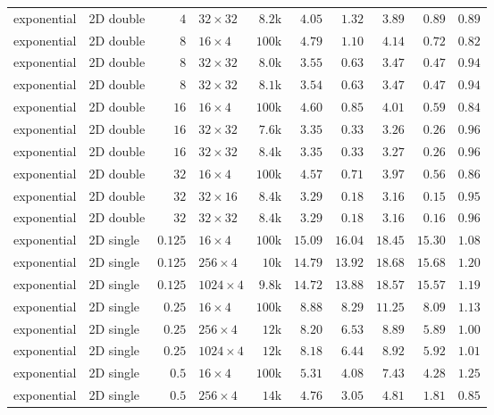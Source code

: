 {\begin{longtable}{llrlrrrrrr}
    exponential & 2D double & $4$ & $32{\times}32$ & $8.2$k & $4.05$ & $1.32$ & $3.89$ & $0.89$ & $0.89$ \\
    exponential & 2D double & $8$ & $16{\times}4$ & $100$k & $4.79$ & $1.10$ & $4.14$ & $0.72$ & $0.82$ \\
    exponential & 2D double & $8$ & $32{\times}32$ & $8.0$k & $3.55$ & $0.63$ & $3.47$ & $0.47$ & $0.94$ \\
    exponential & 2D double & $8$ & $32{\times}32$ & $8.1$k & $3.54$ & $0.63$ & $3.47$ & $0.47$ & $0.94$ \\
    exponential & 2D double & $16$ & $16{\times}4$ & $100$k & $4.60$ & $0.85$ & $4.01$ & $0.59$ & $0.84$ \\
    exponential & 2D double & $16$ & $32{\times}32$ & $7.6$k & $3.35$ & $0.33$ & $3.26$ & $0.26$ & $0.96$ \\
    exponential & 2D double & $16$ & $32{\times}32$ & $8.4$k & $3.35$ & $0.33$ & $3.27$ & $0.26$ & $0.96$ \\
    exponential & 2D double & $32$ & $16{\times}4$ & $100$k & $4.57$ & $0.71$ & $3.97$ & $0.56$ & $0.86$ \\
    exponential & 2D double & $32$ & $32{\times}16$ & $8.4$k & $3.29$ & $0.18$ & $3.16$ & $0.15$ & $0.95$ \\
    exponential & 2D double & $32$ & $32{\times}32$ & $8.4$k & $3.29$ & $0.18$ & $3.16$ & $0.16$ & $0.96$ \\
    \midrule
    exponential & 2D single & $0.125$ & $16{\times}4$ & $100$k & $15.09$ & $16.04$ & $18.45$ & $15.30$ & $1.08$ \\
    exponential & 2D single & $0.125$ & $256{\times}4$ & $10$k & $14.79$ & $13.92$ & $18.68$ & $15.68$ & $1.20$ \\
    exponential & 2D single & $0.125$ & $1024{\times}4$ & $9.8$k & $14.72$ & $13.88$ & $18.57$ & $15.57$ & $1.19$ \\
    exponential & 2D single & $0.25$ & $16{\times}4$ & $100$k & $8.88$ & $8.29$ & $11.25$ & $8.09$ & $1.13$ \\
    exponential & 2D single & $0.25$ & $256{\times}4$ & $12$k & $8.20$ & $6.53$ & $8.89$ & $5.89$ & $1.00$ \\
    exponential & 2D single & $0.25$ & $1024{\times}4$ & $12$k & $8.18$ & $6.44$ & $8.92$ & $5.92$ & $1.01$ \\
    exponential & 2D single & $0.5$ & $16{\times}4$ & $100$k & $5.31$ & $4.08$ & $7.43$ & $4.28$ & $1.25$ \\
    exponential & 2D single & $0.5$ & $256{\times}4$ & $14$k & $4.76$ & $3.05$ & $4.81$ & $1.81$ & $0.85$ \\

\end{longtable}}

